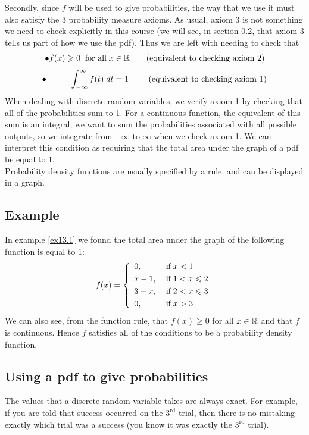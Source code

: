 \noindent Secondly, since $f$ will be used to give probabilities, the way that we use it must also satisfy the 3 probability measure axioms. As usual, axiom 3 is not something we need to check explicitly in this course (we will see, in section \ref{subsec15.1}, that axiom 3 tells us part of how we use the pdf).  Thus we are left with needing to check that
\[
\bullet f(x) \geqslant 0 \;\; \text{for all} \; x \in \mathbb{R} \tag{equivalent to checking axiom 2}
\]
\[
\bullet \hspace{1cm} \int_{-\infty}^\infty f(t) \; dt = 1 \hspace{0.14cm} \tag{equivalent to checking axiom 1}
\]
When dealing with discrete random variables, we verify axiom 1 by checking that all of the probabilities sum to 1. For a continuous function, the equivalent of this sum is an integral; we want to sum the probabilities associated with all possible outputs, so we integrate from $-\infty$ to $\infty$ when we check axiom 1. We can interpret this condition as requiring that the total area under the graph of a pdf be equal to 1. \\

\noindent Probability density functions are usually specified by a rule, and can be displayed in a graph.

\subsection{Example} \label{ex15.1}
In example \ref{ex13.1} we found the total area under the graph of the following function is equal to 1:
\[
f(x) = \left\{ \begin{array}{ll}
0, & \; \text{if} \; x < 1 \smallskip \\
x - 1, & \; \text{if} \; 1 < x \leq 2 \smallskip \\
3-x, & \; \text{if} \; 2 < x \leq 3 \smallskip \\
0, &  \; \text{if} \; x > 3
\end{array}
\right.
\]
We can also see, from the function rule, that $f(x) \geq 0$ for all $x \in \mathbb{R}$ and that $f$ is continuous. Hence $f$ satisfies all of the conditions to be a probability density function.

\subsection{Using a pdf to give probabilities} \label{subsec15.1}
The values that a discrete random variable takes are always exact. For example, if you are told that success occurred on the $3^\text{rd}$ trial, then there is no mistaking exactly which trial was a success (you know it was exactly the $3^\text{rd}$ trial). \\

